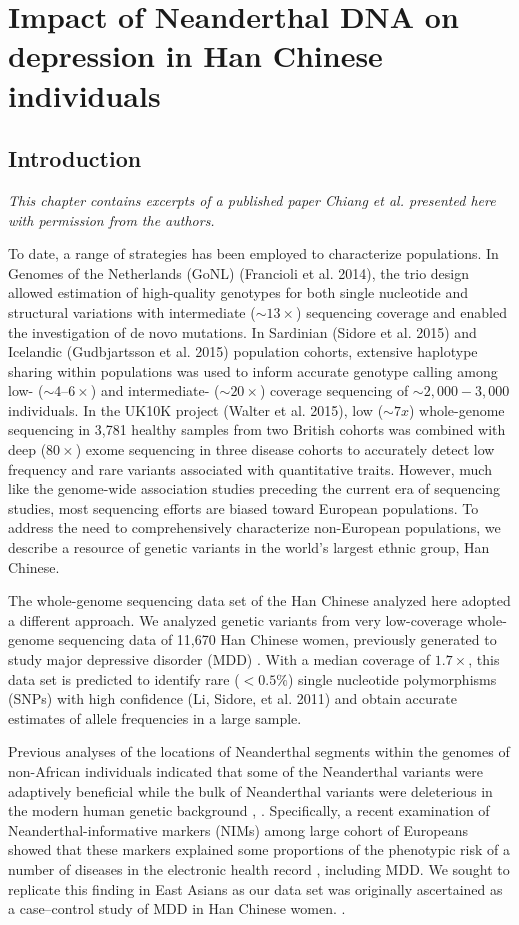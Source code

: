 \chapter{Impact of Neanderthal DNA on depression in Han Chinese individuals}
\section{Introduction} 
\textit{This chapter contains excerpts of a published paper Chiang et al. \cite{chiang2018comprehensive} presented here with permission from the authors.
}

To date, a range of strategies has been employed to characterize populations. In Genomes of the Netherlands (GoNL) (Francioli et al. 2014), the trio design allowed estimation of high-quality genotypes for both single nucleotide and structural variations with intermediate ($\sim13\times$) sequencing coverage and enabled the investigation of de novo mutations. In Sardinian (Sidore et al. 2015) and Icelandic (Gudbjartsson et al. 2015) population cohorts, extensive haplotype sharing within populations was used to inform accurate genotype calling among low- ($\sim4 – 6\times$) and intermediate- ($\sim20\times$) coverage sequencing of $\sim2,000 - 3,000$ individuals. In the UK10K project (Walter et al. 2015), low ($\sim 7x $) whole-genome sequencing in 3,781 healthy samples from two British cohorts was combined with deep ($80\times$) exome sequencing in three disease cohorts to accurately detect low frequency and rare variants associated with quantitative traits. However, much like the genome-wide association studies preceding the current era of sequencing studies, most sequencing efforts are biased toward European populations. To address the need to comprehensively characterize non-European populations, we describe a resource of genetic variants in the world’s largest ethnic group, Han Chinese.

The whole-genome sequencing data set of the Han Chinese analyzed here adopted a different approach. We analyzed genetic variants from very low-coverage whole-genome sequencing data of 11,670 Han Chinese women, previously generated to study major depressive disorder (MDD) \cite{cai2015sparse}. With a median coverage of $1.7\times$, this data set is predicted to identify rare ($<0.5\%$) single nucleotide polymorphisms (SNPs) with high confidence (Li, Sidore, et al. 2011) and obtain accurate estimates of allele frequencies in a large sample. 

Previous analyses of the locations of Neanderthal segments within the genomes of non-African individuals indicated that some of the Neanderthal variants were adaptively beneficial while the bulk of Neanderthal variants were deleterious in the modern human genetic background \cite{harris2016genetic}, \cite{juric2016strength}. Specifically, a recent examination of Neanderthal-informative markers (NIMs) among large cohort of Europeans showed that these markers explained some proportions of the phenotypic risk of a number of diseases in the electronic health record \cite{simonti2016phenotypic}, including MDD. We sought to replicate this finding in East Asians as our data set was originally ascertained as a case–control study of MDD in Han Chinese women. \cite{cai2015sparse}.
